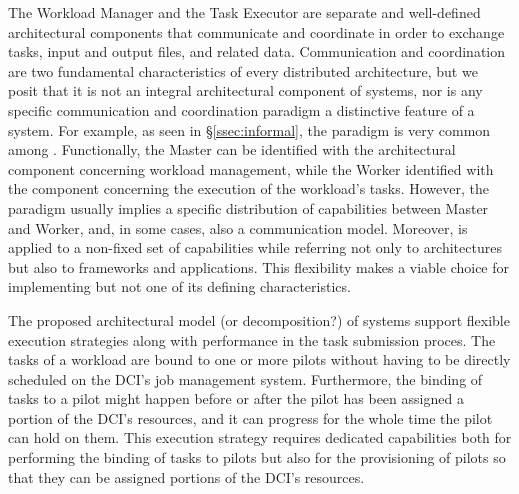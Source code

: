 \documentclass{sig-alternate}
\begin{document}
The Workload Manager and the Task Executor are separate and
well-defined architectural components that communicate and coordinate
in order to exchange tasks, input and output files, and related data.
Communication and coordination are two fundamental characteristics of
every distributed architecture, but we posit that it is not an
integral architectural component of \pilotjob systems, nor is any
specific communication and coordination paradigm a distinctive feature
of a \pilotjob system.
For example, as seen in \S\ref{ssec:informal}, the \MW paradigm is
very common among \pilotjobs. Functionally, the Master can be
identified with the architectural component concerning workload
management, while the Worker identified with the component concerning
the execution of the workload's tasks. However, the \MW paradigm
usually implies a specific distribution of capabilities between Master
and Worker, and, in some cases, also a communication model. Moreover,
\MW is applied to a non-fixed set of capabilities while referring not
only to architectures but also to frameworks and applications. This
flexibility makes \MW a viable choice for implementing \pilotjobs but
not one of its defining
characteristics. %


The proposed architectural model (or decomposition?) of \pilotjob
systems support flexible execution strategies along with 
performance  in the task submission proces.
The tasks of a workload are bound to one or more pilots without having
to be directly scheduled on the DCI's job management
system. Furthermore, the binding of tasks to a pilot might happen
before or after the pilot has been assigned a portion of the DCI's
resources, and it can progress for the whole time the pilot can hold
on them. This execution strategy requires dedicated capabilities both
for performing the binding of tasks to pilots but also for the
provisioning of pilots so that they can be assigned portions of the
DCI's resources. 
\end{document}
